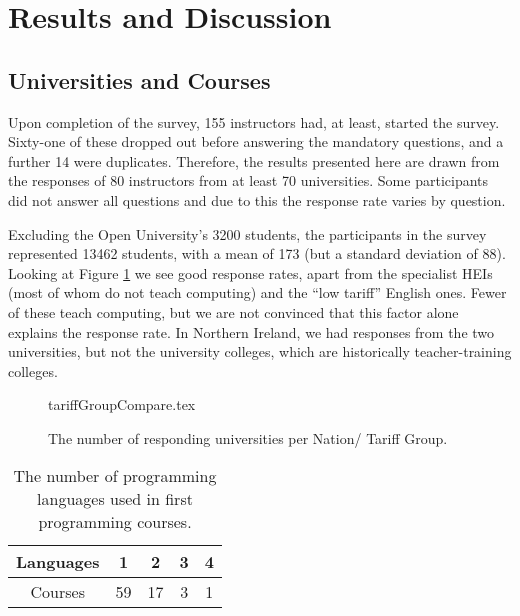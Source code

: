 \documentclass{sig-alternate}
\begin{document}
\section{Results and Discussion}\label{results}

\subsection{Universities and Courses}
Upon completion of the survey, 155 instructors had, at least, started the survey. Sixty-one of these dropped out before answering the mandatory questions, and a further 14 were duplicates. Therefore, the results presented here are drawn from the responses of 80 instructors from at least 70 universities. Some participants did not answer all questions and due to this the response rate varies by question.

Excluding the Open University's 3200 students, the participants in the survey represented 13462 students, with a mean of 173 (but a standard deviation of 88). Looking at Figure \ref{fig:TG} we see good response rates, apart from the specialist HEIs (most of whom do not teach computing) and the ``low tariff'' English ones. Fewer of these teach computing, %
but we are not convinced that this factor alone explains the response rate. In Northern Ireland, we had responses from the two universities, but not the university colleges, which are historically teacher-training colleges.
\begin{figure}
\begin{center}
{tariffGroupCompare.tex}\vskip-12pt
\caption{The number of responding universities per Nation/   
 Tariff Group.\label{fig:TG}}
\end{center}
\end{figure}

\begin{table}[]
\centering
\caption{The number of programming languages used in first programming courses.}
\label{tab:numLanguages}
\begin{tabular}{ccccc}
\hline
Languages & 1  & 2  & 3 & 4 \\ \hline
Courses   & 59 & 17 & 3 & 1 \\ \hline
\end{tabular}
\end{table}
\end{document}
